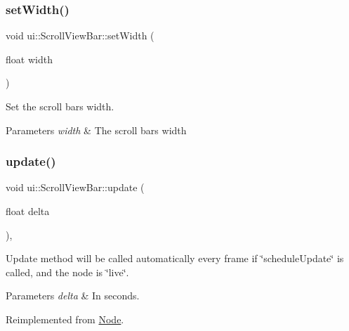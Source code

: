 \subsubsection{\texorpdfstring{set\+Width()}{setWidth()}\hspace{0.1cm}{\footnotesize\ttfamily [2/2]}}
{\footnotesize\ttfamily void ui\+::\+Scroll\+View\+Bar\+::set\+Width (\begin{DoxyParamCaption}\item[{float}]{width }\end{DoxyParamCaption})}



Set the scroll bar\textquotesingle{}s width. 


\begin{DoxyParams}{Parameters}
{\em width} & The scroll bar\textquotesingle{}s width \\
\hline
\end{DoxyParams}
\mbox{\label{classui_1_1ScrollViewBar_a26112897dfbfd6d3d727337f65177f1f}} 
\subsubsection{\texorpdfstring{update()}{update()}\hspace{0.1cm}{\footnotesize\ttfamily [1/2]}}
{\footnotesize\ttfamily void ui\+::\+Scroll\+View\+Bar\+::update (\begin{DoxyParamCaption}\item[{float}]{delta }\end{DoxyParamCaption})\hspace{0.3cm}{\ttfamily [override]}, {\ttfamily [virtual]}}

Update method will be called automatically every frame if \char`\"{}schedule\+Update\char`\"{} is called, and the node is \char`\"{}live\char`\"{}. 
\begin{DoxyParams}{Parameters}
{\em delta} & In seconds. \\
\hline
\end{DoxyParams}


Reimplemented from \hyperlink{classNode_a32878481ba54b3856ab53c10af13848e}{Node}.

\mbox{\label{classui_1_1ScrollViewBar_a9584b184a09bc1bf24f1a8805641294b}} 
